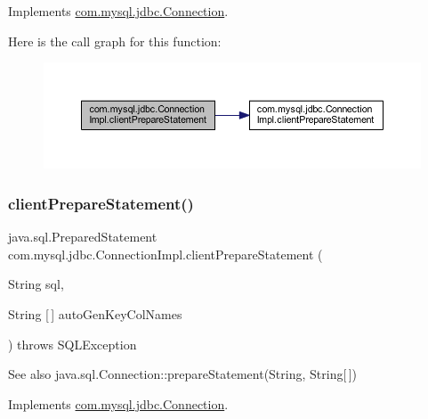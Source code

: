 Implements \mbox{\hyperlink{interfacecom_1_1mysql_1_1jdbc_1_1_connection_a0a5607f53ef9d376f1ff02fcffd038bf}{com.\+mysql.\+jdbc.\+Connection}}.

Here is the call graph for this function\+:\nopagebreak
\begin{figure}[H]
\begin{center}
\leavevmode
\includegraphics[width=350pt]{classcom_1_1mysql_1_1jdbc_1_1_connection_impl_a7c16e87fcf61b55c5737bd2f041a847a_cgraph}
\end{center}
\end{figure}
\mbox{\label{classcom_1_1mysql_1_1jdbc_1_1_connection_impl_a9fcf3d739e8b60bdc9666e938ecd75ab}} 
\subsubsection{\texorpdfstring{client\+Prepare\+Statement()}{clientPrepareStatement()}\hspace{0.1cm}{\footnotesize\ttfamily [5/6]}}
{\footnotesize\ttfamily java.\+sql.\+Prepared\+Statement com.\+mysql.\+jdbc.\+Connection\+Impl.\+client\+Prepare\+Statement (\begin{DoxyParamCaption}\item[{String}]{sql,  }\item[{String \mbox{[}$\,$\mbox{]}}]{auto\+Gen\+Key\+Col\+Names }\end{DoxyParamCaption}) throws S\+Q\+L\+Exception}

\begin{DoxySeeAlso}{See also}
java.\+sql.\+Connection\+::prepare\+Statement(\+String, String\mbox{[}$\,$\mbox{]}) 
\end{DoxySeeAlso}


Implements \mbox{\hyperlink{interfacecom_1_1mysql_1_1jdbc_1_1_connection_a452a8703aca3c45fdafe3e1a5093b8b5}{com.\+mysql.\+jdbc.\+Connection}}.

